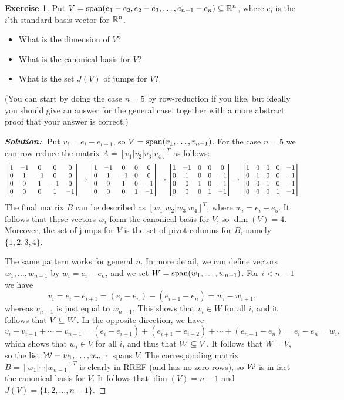 \documentclass[a4paper]{amsart}
\theoremstyle{definition}
\newtheorem{exercise}{Exercise}
\newenvironment{solution}{\begin{proof}[\textbf{Solution:}] \vphantom{u}}{\end{proof}}
\begin{document}
\begin{exercise}\label{ex-jumps-ii}
 Put $V=\operatorname{span}(e_1-e_2,e_2-e_3,\dotsc,e_{n-1}-e_n)\subseteq{\mathbb{R}}^n$, where $e_i$
 is the $i$'th standard basis vector for ${\mathbb{R}}^n$.
 \begin{itemize}
  \item[(a)] What is the dimension of $V$?
  \item[(b)] What is the canonical basis for $V$?
  \item[(c)] What is the set $J(V)$ of jumps for $V$?
 \end{itemize}
 (You can start by doing the case $n=5$ by row-reduction if you like,
 but ideally you should give an answer for the general case, together
 with a more abstract proof that your answer is correct.)
\end{exercise}
\begin{solution}
 Put $v_i=e_i-e_{i+1}$, so $V=\operatorname{span}(v_1,\dotsc,v_{n-1})$.  
 For the case $n=5$ we can row-reduce the matrix
 $A=[v_1|v_2|v_3|v_4]^T$ as follows:
 \[ 
   \left[\begin{matrix} 
    1&-1&0&0&0 \\
    0&1&-1&0&0 \\
    0&0&1&-1&0 \\
    0&0&0&1&-1
   \end{matrix}\right]
   \to 
   \left[\begin{matrix} 
    1&-1&0&0&0 \\
    0&1&-1&0&0 \\
    0&0&1&0&-1 \\
    0&0&0&1&-1
   \end{matrix}\right]
   \to 
   \left[\begin{matrix} 
    1&-1&0&0&0 \\
    0&1&0&0&-1 \\
    0&0&1&0&-1 \\
    0&0&0&1&-1
   \end{matrix}\right]
   \to 
   \left[\begin{matrix} 
    1&0&0&0&-1 \\
    0&1&0&0&-1 \\
    0&0&1&0&-1 \\
    0&0&0&1&-1
   \end{matrix}\right]
 \]
 The final matrix $B$ can be described as $[w_1|w_2|w_3|w_4]^T$, where
 $w_i=e_i-e_5$.  It follows that these vectors $w_i$ form the
 canonical basis for $V$, so $\dim(V)=4$.  Moreover, the set of jumps
 for $V$ is the set of pivot columns for $B$, namely $\{1,2,3,4\}$.

 The same pattern works for general $n$.  In more detail, we can
 define vectors $w_1,\dotsc,w_{n-1}$ by $w_i=e_i-e_n$, and we set
 $W=\operatorname{span}(w_1,\dotsc,w_{n-1})$.  For $i<n-1$ we have 
 \[ v_i = e_i-e_{i+1} = (e_i-e_n) - (e_{i+1}-e_n) = w_i-w_{i+1}, \]
 whereas $v_{n-1}$ is just equal to $w_{n-1}$.  This shows that
 $v_i\in W$ for all $i$, and it follows that $V\subseteq W$.  In the
 opposite direction, we have
 \[ v_i + v_{i+1} + \dotsb + v_{n-1} =
    (e_i-e_{i+1}) + (e_{i+1}-e_{i+2}) + \dotsb + (e_{n-1}-e_n) = 
    e_i - e_n = w_i,
 \]
 which shows that $w_i\in V$ for all $i$, and thus that $W\subseteq V$.  It
 follows that $W=V$, so the list $\mathcal{W}=w_1,\dotsc,w_{n-1}$ spans $V$.
 The corresponding matrix $B=[w_1|\dotsb|w_{n-1}]^T$ is clearly in
 RREF (and has no zero rows),
 so $\mathcal{W}$ is in fact the canonical basis for $V$.  It follows
 that $\dim(V)=n-1$ and $J(V)=\{1,2,\dotsc,n-1\}$.
\end{solution}
\end{document}
